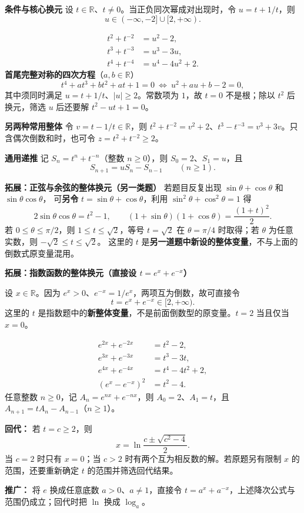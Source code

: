 \begin{statementbox}
\textbf{\textcolor{CStatement}{条件与核心换元}}
设 $t\in\mathbb R$、$t\ne0$。当正负同次幂成对出现时，令 $u=t+1/t$，则
\[
\boxed{u\in(-\infty,-2]\cup[2,+\infty)}.
\]

\[
\begin{aligned}
t^2+t^{-2}&=u^2-2,\\
t^3+t^{-3}&=u^3-3u,\\
t^4+t^{-4}&=u^4-4u^2+2.
\end{aligned}
\]
\textbf{\textcolor{CStatement}{首尾完整对称的四次方程}}（$a,b\in\mathbb R$）
\[
t^4+at^3+bt^2+at+1=0
\ \Longleftrightarrow\ u^2+au+b-2=0,
\]
其中须同时满足 $u=t+1/t$、$|u|\ge2$。常数项为 $1$，故 $t=0$ 不是根；除以 $t^2$ 后换元，筛选 $u$ 后还要解 $t^2-ut+1=0$。

\medskip
\textbf{\textcolor{CStatement}{另两种常用整体}}
令 $v=t-1/t\in\mathbb R$，则 $t^2+t^{-2}=v^2+2$、$t^3-t^{-3}=v^3+3v$。只含偶次倒数和时，也可令 $z=t^2+t^{-2}\ge2$。

\medskip
\textbf{\textcolor{CStatement}{通用递推}}
记 $S_n=t^n+t^{-n}$（整数 $n\ge0$），则 $S_0=2$、$S_1=u$，且
\[
\boxed{S_{n+1}=uS_n-S_{n-1}\qquad(n\ge1)}.
\]

\medskip
\textbf{\textcolor{CStatement}{拓展：正弦与余弦的整体换元（另一类题）}}
若题目反复出现 $\sin\theta+\cos\theta$ 和 $\sin\theta\cos\theta$，
可\textbf{另令} $t=\sin\theta+\cos\theta$，利用 $\sin^2\theta+\cos^2\theta=1$ 得
\[
\boxed{2\sin\theta\cos\theta=t^2-1},\qquad
\boxed{(1+\sin\theta)(1+\cos\theta)=\frac{(1+t)^2}{2}}.
\]
若 $0\le\theta\le\pi/2$，则 $1\le t\le\sqrt2$，等号 $t=\sqrt2$ 在
$\theta=\pi/4$ 时取得；若 $\theta$ 为任意实数，则 $-\sqrt2\le t\le\sqrt2$。
这里的 $t$ 是\textbf{另一道题中新设的整体变量}，不与上面的倒数式原变量混用。

\end{statementbox}
\clearpage

\begin{statementbox}
\textbf{\textcolor{CStatement}{拓展：指数函数的整体换元（直接设 $t=e^x+e^{-x}$）}}

设 $x\in\mathbb R$。因为 $e^x>0$、$e^{-x}=1/e^x$，两项互为倒数，故可直接令
\[
\boxed{t=e^x+e^{-x}\in[2,+\infty)}.
\]
这里的 $t$ 是指数题中的\textbf{新整体变量}，不是前面倒数型的原变量。$t=2$ 当且仅当 $x=0$。

\[
\boxed{\begin{aligned}
e^{2x}+e^{-2x}&=t^2-2,\\
e^{3x}+e^{-3x}&=t^3-3t,\\
e^{4x}+e^{-4x}&=t^4-4t^2+2,\\
(e^x-e^{-x})^2&=t^2-4.
\end{aligned}}
\]
任意整数 $n\ge0$，记 $A_n=e^{nx}+e^{-nx}$，则 $A_0=2$、$A_1=t$，且 $A_{n+1}=tA_n-A_{n-1}$（$n\ge1$）。

\textbf{回代：} 若 $t=c\ge2$，则
\[
\boxed{x=\ln\frac{c\pm\sqrt{c^2-4}}{2}}.
\]
当 $c=2$ 时只有 $x=0$；当 $c>2$ 时有两个互为相反数的解。若原题另有限制 $x$ 的范围，还要重新确定 $t$ 的范围并筛选回代结果。

\textbf{推广：} 将 $e$ 换成任意底数 $a>0$、$a\ne1$，直接令 $t=a^x+a^{-x}$，上述降次公式与范围仍成立；回代时把 $\ln$ 换成 $\log_a$。
\end{statementbox}
\clearpage
